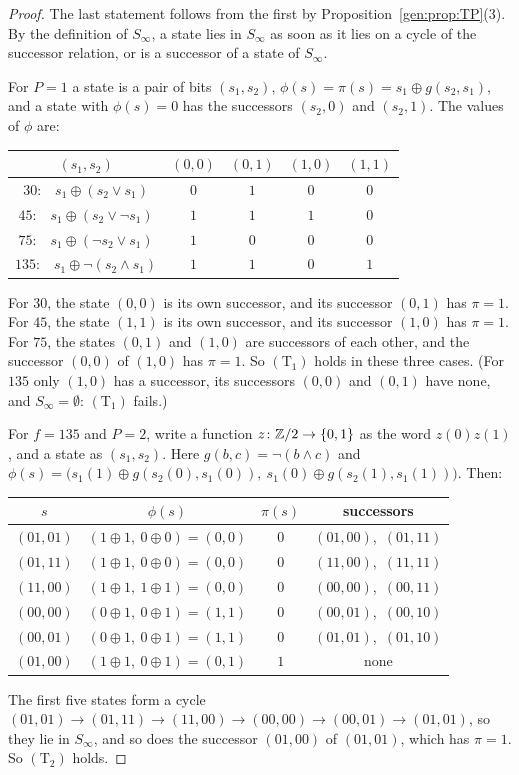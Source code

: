 \begin{proof}
The last statement follows from the first by Proposition~\ref{gen:prop:TP}(3). By the definition of $S_\infty$, a state lies in $S_\infty$ as soon as it lies on a cycle of the successor relation, or is a successor of a state of $S_\infty$.

For $P=1$ a state is a pair of bits $(s_1,s_2)$, $\phi(s)=\pi(s)=s_1\oplus g(s_2,s_1)$, and a state with $\phi(s)=0$ has the successors $(s_2,0)$ and $(s_2,1)$. The values of $\phi$ are:
\begin{center}
\begin{tabular}{ccccc}
\toprule
$(s_1,s_2)$ & $(0,0)$ & $(0,1)$ & $(1,0)$ & $(1,1)$\\
\midrule
$30$:\ \ $s_1\oplus(s_2\vee s_1)$ & $0$ & $1$ & $0$ & $0$\\
$45$:\ \ $s_1\oplus(s_2\vee\neg s_1)$ & $1$ & $1$ & $1$ & $0$\\
$75$:\ \ $s_1\oplus(\neg s_2\vee s_1)$ & $1$ & $0$ & $0$ & $0$\\
$135$:\ \ $s_1\oplus\neg(s_2\wedge s_1)$ & $1$ & $1$ & $0$ & $1$\\
\bottomrule
\end{tabular}
\end{center}
For $30$, the state $(0,0)$ is its own successor, and its successor $(0,1)$ has $\pi=1$. For $45$, the state $(1,1)$ is its own successor, and its successor $(1,0)$ has $\pi=1$. For $75$, the states $(0,1)$ and $(1,0)$ are successors of each other, and the successor $(0,0)$ of $(1,0)$ has $\pi=1$. So $(\mathrm T_1)$ holds in these three cases. (For $135$ only $(1,0)$ has a successor, its successors $(0,0)$ and $(0,1)$ have none, and $S_\infty=\emptyset$: $(\mathrm T_1)$ fails.)

For $f=135$ and $P=2$, write a function $z\colon\mathbb{Z}/2\to\{0,1\}$ as the word $z(0)z(1)$, and a state as $(s_1,s_2)$. Here $g(b,c)=\neg(b\wedge c)$ and $\phi(s)=\bigl(s_1(1)\oplus g(s_2(0),s_1(0)),\ s_1(0)\oplus g(s_2(1),s_1(1))\bigr)$. Then:
\begin{center}
\begin{tabular}{cccc}
\toprule
$s$ & $\phi(s)$ & $\pi(s)$ & successors\\
\midrule
$(01,01)$ & $(1\oplus1,\ 0\oplus0)=(0,0)$ & $0$ & $(01,00)$,\ $(01,11)$\\
$(01,11)$ & $(1\oplus1,\ 0\oplus0)=(0,0)$ & $0$ & $(11,00)$,\ $(11,11)$\\
$(11,00)$ & $(1\oplus1,\ 1\oplus1)=(0,0)$ & $0$ & $(00,00)$,\ $(00,11)$\\
$(00,00)$ & $(0\oplus1,\ 0\oplus1)=(1,1)$ & $0$ & $(00,01)$,\ $(00,10)$\\
$(00,01)$ & $(0\oplus1,\ 0\oplus1)=(1,1)$ & $0$ & $(01,01)$,\ $(01,10)$\\
\midrule
$(01,00)$ & $(1\oplus1,\ 0\oplus1)=(0,1)$ & $1$ & none\\
\bottomrule
\end{tabular}
\end{center}
The first five states form a cycle $(01,01)\to(01,11)\to(11,00)\to(00,00)\to(00,01)\to(01,01)$, so they lie in $S_\infty$, and so does the successor $(01,00)$ of $(01,01)$, which has $\pi=1$. So $(\mathrm T_2)$ holds.
\end{proof}

